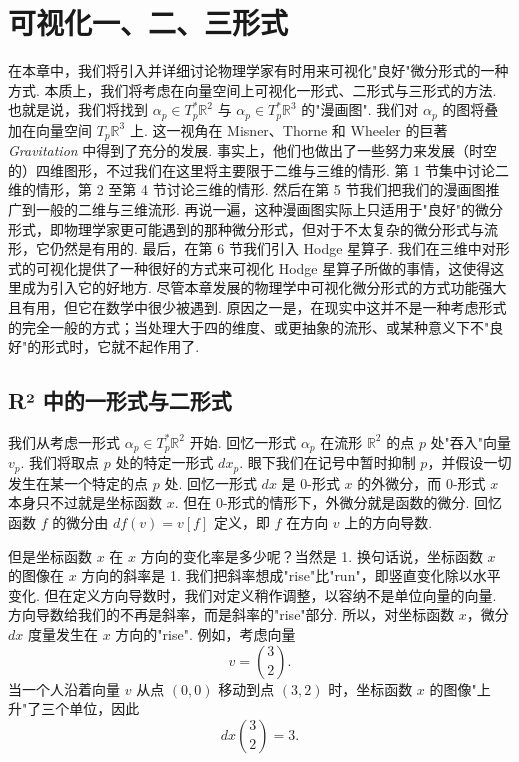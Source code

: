\chapter{可视化一、二、三形式}

在本章中，我们将引入并详细讨论物理学家有时用来可视化"良好"微分形式的一种方式. 本质上，我们将考虑在向量空间上可视化一形式、二形式与三形式的方法. 也就是说，我们将找到 $\alpha_p\in T_p^*\mathbb{R}^2$ 与 $\alpha_p\in T_p^*\mathbb{R}^3$ 的"漫画图". 我们对 $\alpha_p$ 的图将叠加在向量空间 $T_p\mathbb{R}^3$ 上. 这一视角在 Misner、Thorne 和 Wheeler 的巨著 \textit{Gravitation} 中得到了充分的发展. 事实上，他们也做出了一些努力来发展（时空的）四维图形，不过我们在这里将主要限于二维与三维的情形. 第 1 节集中讨论二维的情形，第 2 至第 4 节讨论三维的情形. 然后在第 5 节我们把我们的漫画图推广到一般的二维与三维流形. 再说一遍，这种漫画图实际上只适用于"良好"的微分形式，即物理学家更可能遇到的那种微分形式，但对于不太复杂的微分形式与流形，它仍然是有用的. 最后，在第 6 节我们引入 Hodge 星算子. 我们在三维中对形式的可视化提供了一种很好的方式来可视化 Hodge 星算子所做的事情，这使得这里成为引入它的好地方. 尽管本章发展的物理学中可视化微分形式的方式功能强大且有用，但它在数学中很少被遇到. 原因之一是，在现实中这并不是一种考虑形式的完全一般的方式；当处理大于四的维度、或更抽象的流形、或某种意义下不"良好"的形式时，它就不起作用了.

\section{R² 中的一形式与二形式}

我们从考虑一形式 $\alpha_p\in T_p^*\mathbb{R}^2$ 开始. 回忆一形式 $\alpha_p$ 在流形 $\mathbb{R}^2$ 的点 $p$ 处"吞入"向量 $v_p$. 我们将取点 $p$ 处的特定一形式 $dx_p$. 眼下我们在记号中暂时抑制 $p$，并假设一切发生在某一个特定的点 $p$ 处. 回忆一形式 $dx$ 是 0-形式 $x$ 的外微分，而 0-形式 $x$ 本身只不过就是坐标函数 $x$. 但在 0-形式的情形下，外微分就是函数的微分. 回忆函数 $f$ 的微分由 $df(v)=v[f]$ 定义，即 $f$ 在方向 $v$ 上的方向导数.

但是坐标函数 $x$ 在 $x$ 方向的变化率是多少呢？当然是 1. 换句话说，坐标函数 $x$ 的图像在 $x$ 方向的斜率是 1. 我们把斜率想成"rise"比"run"，即竖直变化除以水平变化. 但在定义方向导数时，我们对定义稍作调整，以容纳不是单位向量的向量. 方向导数给我们的不再是斜率，而是斜率的"rise"部分. 所以，对坐标函数 $x$，微分 $dx$ 度量发生在 $x$ 方向的"rise". 例如，考虑向量
\[
v=\binom{3}{2}.
\]
当一个人沿着向量 $v$ 从点 $(0,0)$ 移动到点 $(3,2)$ 时，坐标函数 $x$ 的图像"上升"了三个单位，因此
\[
dx\binom{3}{2}=3.
\]

